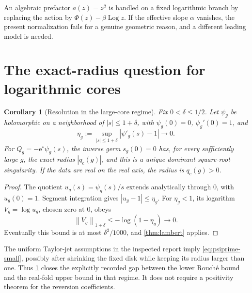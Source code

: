 \documentclass[11pt,a4paper]{article}
\numberwithin{equation}{section}
\newtheorem{corollary}[corollary]{Corollary}
\theoremstyle{definition}
\theoremstyle{remark}
\newcommand{\e}{\mathrm e}
\newcommand{\Log}{\operatorname{Log}}
\newcommand{\norm}[1]{\left\lVert#1\right\rVert}
\begin{document}
An algebraic prefactor $a(z)=z^\beta$ is handled on a fixed logarithmic branch by replacing the action by $\Phi(z)-\beta\Log z$. If the effective slope $\alpha$ vanishes, the present normalization fails for a genuine geometric reason, and a different leading model is needed.

\section{The exact-radius question for logarithmic cores}
\label{sec:repository}
\begin{corollary}[Resolution in the large-core regime]
\label{cor:repo}
Fix $0<\delta\leq1/2$. Let $\psi_g$ be holomorphic on a neighborhood of $|s|\leq1+\delta$, with $\psi_g(0)=0$, $\psi_g'(0)=1$, and
\begin{equation}
 \eta_g:=\sup_{|s|\leq1+\delta}|\psi'_g(s)-1|\longrightarrow0.
 \label{eq:psiprime-small}
\end{equation}
For $Q_g=-\e^s\psi_g(s)$, the inverse germ $s_g(0)=0$ has, for every sufficiently large $g$, the exact radius $|q_{\mathrm c}(g)|$, and this is a unique dominant square-root singularity. If the data are real on the real axis, the radius is $q_{\mathrm c}(g)>0$.
\end{corollary}
\begin{proof}
The quotient $u_g(s)=\psi_g(s)/s$ extends analytically through $0$, with $u_g(0)=1$. Segment integration gives $|u_g-1|\leq\eta_g$. For $\eta_g<1$, its logarithm $V_g=\log u_g$, chosen zero at $0$, obeys
\[
 \norm{V_g}_{1+\delta}\leq-\log(1-\eta_g)\longrightarrow0.
\]
Eventually this bound is at most $\delta^2/1000$, and \cref{thm:lambert} applies.
\end{proof}

The uniform Taylor-jet assumptions in the inspected report imply \eqref{eq:psiprime-small}, possibly after shrinking the fixed disk while keeping its radius larger than one. Thus \cref{cor:repo} closes the explicitly recorded gap between the lower Rouch\'e bound and the real-fold upper bound in that regime. It does not require a positivity theorem for the reversion coefficients.
\end{document}
